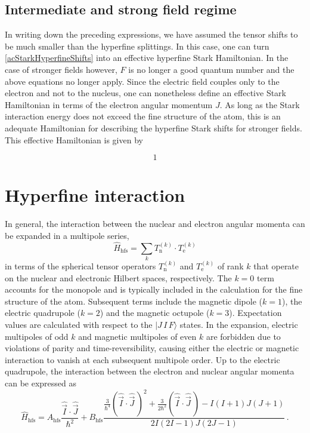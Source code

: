 \documentclass[../Thesis-IJspeert.tex]{subfiles}
\begin{document}
\subsection{Intermediate and strong field regime}
In writing down the preceding expressions, we have assumed the tensor shifts to be much smaller than the hyperfine splittings. In this case, one can turn \autoref{acStarkHyperfineShifts} into an effective hyperfine Stark Hamiltonian. In the case of stronger fields however, $F$ is no longer a good quantum number and the above equations no longer apply. Since the electric field couples only to the electron and not to the nucleus, one can nonetheless define an effective Stark Hamiltonian in terms of the electron angular momentum $J$. As long as the Stark interaction energy does not exceed the fine structure of the atom, this is an adequate Hamiltonian for describing the hyperfine Stark shifts for stronger fields. This effective Hamiltonian is given by

\begin{equation}
	1
\end{equation}

\section{Hyperfine interaction}
\label{hyperfineinteraction}
In general, the interaction between the nuclear and electron angular momenta can be expanded in a multipole series,
\begin{equation}
	\hat{H}_{\text{hfs}}=\sum_{k}T_\text{n}^{(k)} \cdot T_\text{e}^{(k)}
\end{equation}
in terms of the spherical tensor operators $T_\text{n}^{(k)}$ and $T_\text{e}^{(k)}$ of rank $k$ that operate on the nuclear and electronic Hilbert spaces, respectively. The $k = 0$ term accounts for the monopole and is typically included in the calculation for the fine structure of the atom. Subsequent terms include the magnetic dipole ($k=1$), the electric quadrupole ($k=2$) and the magnetic octupole ($k=3$). Expectation values are calculated with respect to the $|J\, I\, F\rangle$ states. In the expansion, electric multipoles of odd $k$ and magnetic multipoles of even $k$ are forbidden due to violations of parity and time-reversibility, causing either the electric or magnetic interaction to vanish at each subsequent multipole order. Up to the electric quadrupole, the interaction between the electron and nuclear angular momenta can be expressed as
\begin{equation}
\hat{H}_{\text{hfs}}=A_{\text{hfs}} \frac{\hat{\vec{I}} \cdot \hat{\vec{J}}}{\hbar^2}+B_{\text{hfs}} \frac{\frac{3}{\hbar^4} (\hat{\vec{I}} \cdot \hat{\vec{J}} \,)^2+\frac{3}{2 \hbar^2}(\hat{\vec{I}} \cdot \hat{\vec{J}}\,)-I(I+1) J(J+1)}{2 I(2 I-1) J(2 J-1)} \,.
\iffalse
+C_{\text{hfs}} \frac{\frac{10}{\hbar^3}(\mathbf{I} \cdot \mathbf{J})^3+\frac{20}{\hbar^2}(\mathbf{I} \cdot \mathbf{J})^2+\frac{2}{\hbar}(\mathbf{I} \cdot \mathbf{J})[I(I+1)+J(J+1)+3-3 I(I+1) J(J+1)]-5 I(I+1) J(J+1)}{I(I-1)(2 I-1) J(J-1)(2 J-1)} .
\fi
\end{equation}
\end{document}
